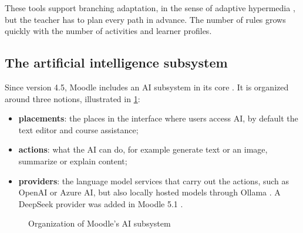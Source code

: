 These tools support branching adaptation, in the sense of adaptive
hypermedia \cite{brusilovsky2001}, but the teacher has to plan every path
in advance. The number of rules grows quickly with the number of
activities and learner profiles.

\subsection{The artificial intelligence subsystem}
\label{subsec-moodle-ai}

Since version 4.5, Moodle includes an AI subsystem in its core
\cite{moodle45,moodle_ai}. It is organized around three notions,
illustrated in \cref{fig-moodle-ai}:

\begin{itemize}
  \item \textbf{placements}: the places in the interface where users access
        AI, by default the text editor and course assistance;
  \item \textbf{actions}: what the AI can do, for example generate text or
        an image, summarize or explain content;
  \item \textbf{providers}: the language model services that carry out the
        actions, such as OpenAI or Azure AI, but also locally hosted models
        through Ollama \cite{moodle_ai}. A DeepSeek provider was added in
        Moodle 5.1 \cite{eledia2026}.
\end{itemize}

\begin{figure}[htbp]
\centering
{}
\caption{Organization of Moodle's AI subsystem}
\label{fig-moodle-ai}
\end{figure}

